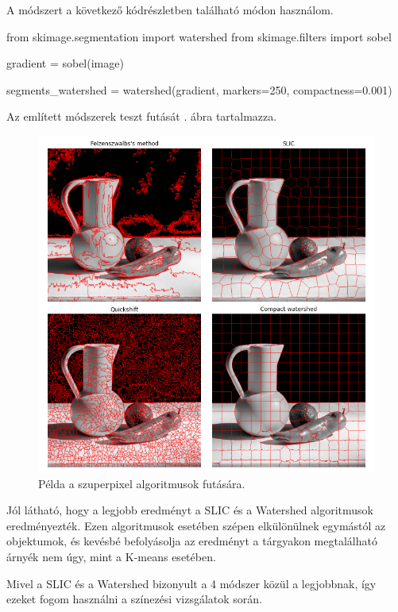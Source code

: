 A módszert a következő kódrészletben található módon használom.
\begin{python}
from skimage.segmentation import watershed
from skimage.filters import sobel

gradient = sobel(image)

segments_watershed = watershed(gradient, markers=250, compactness=0.001)
\end{python}


Az említett módszerek teszt futását . ábra tartalmazza.

\begin{figure}[h]
\centering
\includegraphics[scale=0.6]{images/superpixel_example.png}
\caption{Példa a szuperpixel algoritmusok futására. }
\label{fig:superpixel_example}
\end{figure}

Jól látható, hogy a legjobb eredményt a SLIC és a Watershed algoritmusok eredményezték. Ezen algoritmusok esetében szépen elkülönülnek egymástól az objektumok, és kevésbé befolyásolja az eredményt a tárgyakon megtalálható árnyék nem úgy, mint a K-means esetében.

Mivel a SLIC és a Watershed bizonyult a 4 módszer közül a legjobbnak, így ezeket fogom használni a színezési vizsgálatok során.
